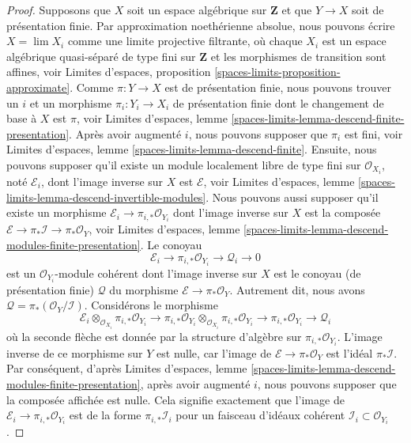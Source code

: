 \begin{proof}
\medskip\noindent
Supposons que $X$ soit un espace algébrique sur $\mathbf{Z}$ et que
$Y \to X$ soit de présentation finie. Par approximation noethérienne
absolue, nous pouvons écrire $X = \lim X_i$ comme une limite projective filtrante,
où chaque $X_i$ est un espace algébrique quasi-séparé de type fini
sur $\mathbf{Z}$ et les morphismes de transition sont affines, voir
Limites d'espaces, proposition \ref{spaces-limits-proposition-approximate}.
Comme $\pi : Y \to X$ est de présentation finie, nous pouvons trouver un $i$
et un morphisme $\pi_i : Y_i \to X_i$ de présentation finie
dont le changement de base à $X$ est $\pi$, voir
Limites d'espaces, lemme
\ref{spaces-limits-lemma-descend-finite-presentation}.
Après avoir augmenté $i$, nous pouvons supposer que $\pi_i$ est fini, voir
Limites d'espaces, lemme
\ref{spaces-limits-lemma-descend-finite}.
Ensuite, nous pouvons supposer qu'il existe un module localement
libre de type fini sur $\mathcal{O}_{X_i}$, noté $\mathcal{E}_i$,
dont l'image inverse sur $X$ est $\mathcal{E}$, voir
Limites d'espaces, lemme \ref{spaces-limits-lemma-descend-invertible-modules}.
Nous pouvons aussi supposer qu'il existe un morphisme
$\mathcal{E}_i \to \pi_{i, *}\mathcal{O}_{Y_i}$
dont l'image inverse sur $X$ est la composée
$\mathcal{E} \to \pi_*\mathcal{I} \to \pi_*\mathcal{O}_Y$, voir
Limites d'espaces, lemme
\ref{spaces-limits-lemma-descend-modules-finite-presentation}.
Le conoyau
$$
\mathcal{E}_i \to \pi_{i, *}\mathcal{O}_{Y_i} \to \mathcal{Q}_i \to 0
$$
est un $\mathcal{O}_{Y_i}$-module cohérent dont l'image inverse sur $X$
est le conoyau (de présentation finie) $\mathcal{Q}$ du morphisme
$\mathcal{E} \to \pi_*\mathcal{O}_Y$. Autrement dit, nous avons
$\mathcal{Q} = \pi_*(\mathcal{O}_Y/\mathcal{I})$. Considérons
le morphisme
$$
\mathcal{E}_i
\otimes_{\mathcal{O}_{X_i}}
\pi_{i, *} \mathcal{O}_{Y_i}
\longrightarrow
\pi_{i, *}\mathcal{O}_{Y_i}
\otimes_{\mathcal{O}_{X_i}}
\pi_{i, *} \mathcal{O}_{Y_i}
\to
\pi_{i, *} \mathcal{O}_{Y_i}
\to
\mathcal{Q}_i
$$
où la seconde flèche est donnée par la structure d'algèbre
sur $\pi_{i, *}\mathcal{O}_{Y_i}$. L'image inverse de ce morphisme
sur $Y$ est nulle, car l'image de $\mathcal{E} \to \pi_*\mathcal{O}_Y$
est l'idéal $\pi_*\mathcal{I}$. Par conséquent, d'après
Limites d'espaces, lemme
\ref{spaces-limits-lemma-descend-modules-finite-presentation},
après avoir augmenté $i$, nous pouvons supposer que la composée affichée
est nulle. Cela signifie exactement que l'image de
$\mathcal{E}_i \to \pi_{i, *}\mathcal{O}_{Y_i}$
est de la forme $\pi_{i, *}\mathcal{I}_i$
pour un faisceau d'idéaux cohérent $\mathcal{I}_i \subset \mathcal{O}_{Y_i}$.

\end{proof}
